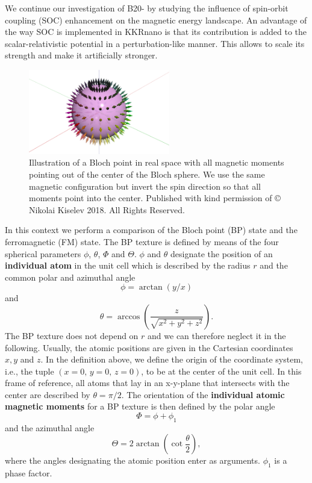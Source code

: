 \documentclass[graybox]{svmult}
\newcommand{\beq}{\begin{equation}}
\newcommand{\eeq}{\end{equation}}
\begin{document}
We continue our investigation of B20- by studying the influence of spin-orbit
coupling (SOC) enhancement on the magnetic energy landscape.
An advantage of the way SOC is implemented in KKRnano is that
its contribution is added to the scalar-relativistic
potential in a perturbation-like manner. This allows to scale its strength and make it
artificially stronger.
\begin{figure}[htb]
	\sidecaption
	\includegraphics[width=0.55\textwidth]{Figures/blochpoint.eps}
	\caption{Illustration of a Bloch point in real space with all magnetic moments
	pointing out of the center of the Bloch sphere.
	We use the same magnetic configuration but invert the spin direction so that all moments point
	into the center. Published with kind permission of © Nikolai Kiselev 2018. All Rights Reserved.
	}
	\label{fig:mnge_blochpoint}
\end{figure}
In this context we perform a comparison of the Bloch point (BP) state 
and the ferromagnetic (FM) state.
The BP texture is defined by means of the four spherical parameters $\phi$, $\theta$, 
$\Phi$ and $\Theta$.
$\phi$ and $\theta$ designate the position of an \textbf{individual atom} in the unit cell
which is described by the radius $r$ and the common polar and azimuthal angle
\beq
\phi = \arctan{\left(y/x\right)}
\eeq
and
\beq
\theta = \arccos{\left( \frac{z}{\sqrt{x^2+y^2+z^2}} \right)}.
\eeq
The BP texture does not depend on $r$ and we can therefore neglect it in the following.
Usually, the atomic positions are given in the Cartesian coordinates $x,y$ and $z$.
In the definition above, we define the origin of the coordinate system, i.e., the tuple $(x=0, \, y=0, \, z=0)$,
to be at the center of the unit cell.
In this frame of reference, all atoms that lay in an x-y-plane that intersects with the center
are described by $\theta=\pi/2$.
The orientation of the \textbf{individual atomic magnetic moments} for a BP texture is then defined 
by the polar angle
\beq
\Phi = \phi + \phi_{1}
\eeq
and the azimuthal angle
\beq
\Theta = 2 \arctan{\left(\cot{\frac{\theta}{2}} \right)},
\eeq
where the angles designating the atomic position enter as arguments. $\phi_{1}$ is a phase factor.
\end{document}

